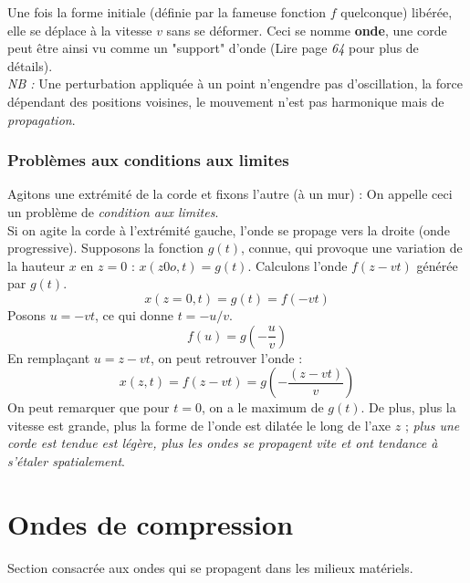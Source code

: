 \documentclass	[11pt, a4paper, openany]{book}
\begin{document}
Une fois la forme initiale (définie par la fameuse fonction $f$ quelconque) libérée, elle se déplace à la vitesse $v$ sans se déformer. Ceci se nomme \textbf{onde}, une corde peut être ainsi vu comme un "support" d'onde (Lire page \textit{64} pour plus de détails).\\

\textit{NB :} Une perturbation appliquée à un point n'engendre pas d'oscillation, la force dépendant des positions voisines, le mouvement n'est pas harmonique mais de \textit{propagation}.

\subsubsection{Problèmes aux conditions aux limites}
Agitons une extrémité de la corde et fixons l'autre (à un mur) : On appelle ceci un problème de \textit{condition aux limites}.\\

Si on agite la corde à l'extrémité gauche, l'onde se propage vers la droite (onde progressive). Supposons la fonction $g(t)$, connue, qui provoque une variation de la hauteur $x$ en $z = 0$ : $x(z0o, t) = g(t)$. Calculons l'onde $f(z-vt)$ générée par $g(t)$.
\begin{equation}
x(z=0, t) = g(t) = f(-vt)
\end{equation}
Posons $u = -vt$, ce qui donne $t=-u/v$.
\begin{equation}
f(u) = g(-\frac{u}{v})
\end{equation}
En remplaçant $u = z - vt$, on peut retrouver l'onde : 
\begin{equation}
x(z, t) = f(z - vt) = g(-\frac{(z-vt)}{v})
\end{equation}
On peut remarquer que pour $t=0$, on a le maximum de $g(t)$. De plus, plus la vitesse est grande, plus la forme de l'onde est dilatée le long de l'axe $z$ ; \textit{plus une corde est tendue est légère, plus les ondes se propagent vite et ont tendance à s'étaler spatialement}.

\section{Ondes de compression}
Section consacrée aux ondes qui se propagent dans les milieux matériels.
\end{document}

